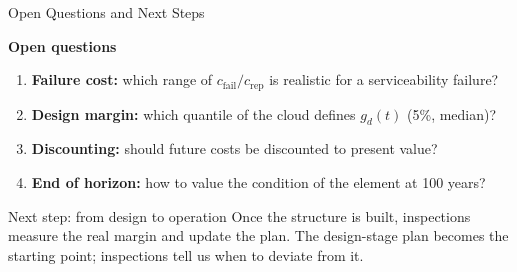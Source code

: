 \begin{frame}{Open Questions and Next Steps}

\justifying

\textbf{Open questions}
\begin{enumerate}
  \item \textbf{Failure cost:} which range of $c_\mathrm{fail}/c_\mathrm{rep}$ is realistic for a serviceability failure?
  \item \textbf{Design margin:} which quantile of the cloud defines $g_d(t)$ (5\%, median)?
  \item \textbf{Discounting:} should future costs be discounted to present value?
  \item \textbf{End of horizon:} how to value the condition of the element at 100 years?
\end{enumerate}

\vspace{0.3cm}

\begin{block}{Next step: from design to operation}
\justifying
Once the structure is built, inspections measure the real margin and update the plan.
The design-stage plan becomes the starting point; inspections tell us when to deviate from it.
\end{block}

\end{frame}
